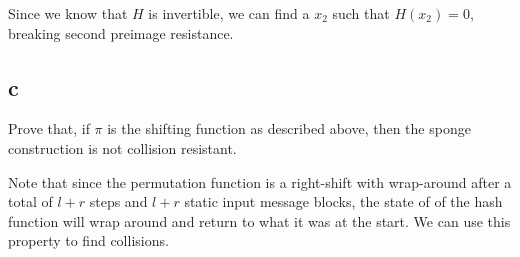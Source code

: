 \documentclass[11pt]{article}
\begin{document}
Since we know that $H$ is invertible, we can find a $x_2$ such that $H(x_2) = 0$, breaking second preimage resistance.

\subsection{c}

Prove that, if $\pi$ is the shifting function as described above, then the sponge construction is not collision resistant.

Note that since the permutation function is a right-shift with wrap-around after a total of $l + r$ steps and $l+r$ static input message blocks, the state of of the hash function will wrap around and return to what it was at the start. We can use this property to find collisions.
\end{document}
